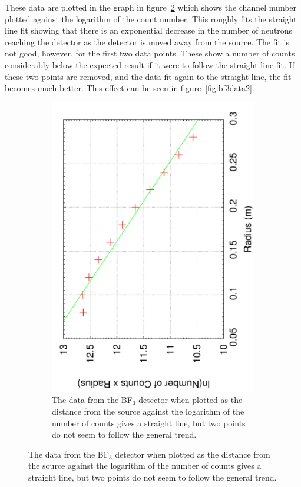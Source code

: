 These data are plotted in the graph in figure~\ref{fig:bf3data1} which shows the channel number plotted against the logarithm of the count number. This roughly fits the straight line fit showing that there is an exponential decrease in the number of neutrons reaching the detector as the detector is moved away from the source. The fit is not good, however, for the first two data points. These show a number of counts considerably below the expected result if it were to follow the straight line fit. If these two points are removed, and the data fit again to the straight line, the fit becomes much better. This effect can be seen in figure~\ref{fig:bf3data2}. 
\begin{figure}[ht]
  \centering
  \begin{subfigure}[b]{0.48\textwidth}
    \centering
    \includegraphics[angle=270,width=\textwidth]{BF3data1.pdf}
    \caption{The data from the BF$_3$ detector when plotted as the distance from the source against the logarithm of the number of counts gives a straight line, but two points do not seem to follow the general trend.\label{fig:bf3data1}}

\end{subfigure}
\end{figure}
